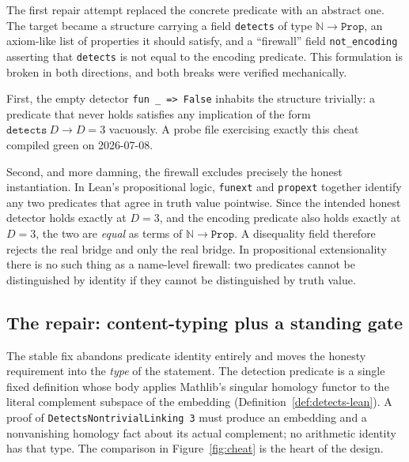 \documentclass[11pt]{article}
\theoremstyle{definition}
\newcommand{\N}{\mathbb{N}}
\newcommand{\lean}[1]{\texttt{#1}}
\begin{document}
The first repair attempt replaced the concrete predicate with an abstract one. The target became a structure carrying a field \lean{detects} of type $\N \to \lean{Prop}$, an axiom-like list of properties it should satisfy, and a ``firewall'' field \lean{not\_encoding} asserting that \lean{detects} is not equal to the encoding predicate. This formulation is broken in both directions, and both breaks were verified mechanically.

First, the empty detector \lean{fun \_ => False} inhabits the structure trivially: a predicate that never holds satisfies any implication of the form $\lean{detects}\ D \to D = 3$ vacuously. A probe file exercising exactly this cheat compiled green on 2026-07-08.

Second, and more damning, the firewall excludes precisely the honest instantiation. In Lean's propositional logic, \lean{funext} and \lean{propext} together identify any two predicates that agree in truth value pointwise. Since the intended honest detector holds exactly at $D = 3$, and the encoding predicate also holds exactly at $D=3$, the two are \emph{equal} as terms of $\N \to \lean{Prop}$. A disequality field therefore rejects the real bridge and only the real bridge. In propositional extensionality there is no such thing as a name-level firewall: two predicates cannot be distinguished by identity if they cannot be distinguished by truth value.

\subsection{The repair: content-typing plus a standing gate}

The stable fix abandons predicate identity entirely and moves the honesty requirement into the \emph{type} of the statement. The detection predicate is a single fixed definition whose body applies Mathlib's singular homology functor to the literal complement subspace of the embedding (Definition~\ref{def:detects-lean}). A proof of \lean{DetectsNontrivialLinking 3} must produce an embedding and a nonvanishing homology fact about its actual complement; no arithmetic identity has that type. The comparison in Figure~\ref{fig:cheat} is the heart of the design.
\end{document}
